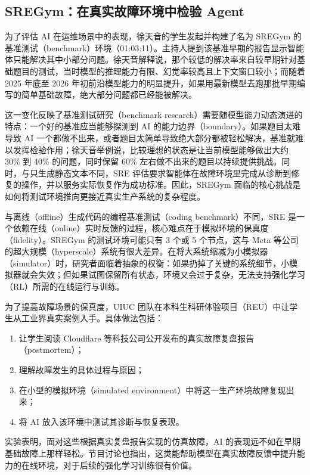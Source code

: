 \documentclass[UTF8,a4paper,11pt,fontset=fandol]{ctexart}
\begin{document}
\subsection{SREGym：在真实故障环境中检验 Agent}
为了评估 AI 在运维场景中的表现，徐天音的学生发起并构建了名为 SREGym 的基准测试（benchmark）环境（01:03:11）。主持人提到该基准早期的报告显示智能体只能解决其中小部分问题。徐天音解释说，那个较低的解决率来自较早期针对基础题目的测试，当时模型的推理能力有限、幻觉率较高且上下文窗口较小；而随着 2025 年底至 2026 年初前沿模型能力的明显提升，如果用最新模型去跑那批早期编写的简单基础故障，绝大部分问题都已经能被解决。

这一变化反映了基准测试研究（benchmark research）需要随模型能力动态演进的特点：一个好的基准应当能够探测到 AI 的能力边界（boundary）。如果题目太难导致 AI 一个都做不出来，或者题目太简单导致绝大部分都被轻松解决，基准就难以发挥检验作用；徐天音举例说，比较理想的状态是让当前模型能够做出大约 30\% 到 40\% 的问题，同时保留 60\% 左右做不出来的题目以持续提供挑战。同时，与只生成静态文本不同，SRE 评估要求智能体在故障环境里完成从诊断到修复的操作，并以服务实际恢复作为成功标准。因此，SREGym 面临的核心挑战是如何将测试环境推向更接近真实生产系统的复杂程度。

与离线（offline）生成代码的编程基准测试（coding benchmark）不同，SRE 是一个依赖在线（online）实时反馈的过程，核心难点在于模拟环境的保真度（fidelity）。SREGym 的测试环境可能只有 3 个或 5 个节点，这与 Meta 等公司的超大规模（hyperscale）系统有很大差异。在将大系统缩减为小模拟器（simulator）时，研究者面临着抽象的权衡：如果扔掉了关键的系统细节，小模拟器就会失效；但如果试图保留所有状态，环境又会过于复杂，无法支持强化学习（RL）所需的在线运行与训练。

为了提高故障场景的保真度，UIUC 团队在本科生科研体验项目（REU）中让学生从工业界真实案例入手。具体做法包括：
\begin{enumerate}
\item 让学生阅读 Cloudflare 等科技公司公开发布的真实故障复盘报告（postmortem）；
\item 理解故障发生的具体过程与原因；
\item 在小型的模拟环境（simulated environment）中将这一生产环境故障复现出来；
\item 将 AI 放入该环境中测试其诊断与恢复表现。
\end{enumerate}
实验表明，面对这些根据真实复盘报告实现的仿真故障，AI 的表现远不如在早期基础故障上那样轻松。节目讨论也指出，这类能帮助模型在真实故障反馈中提升能力的在线环境，对于后续的强化学习训练很有价值。
\end{document}
